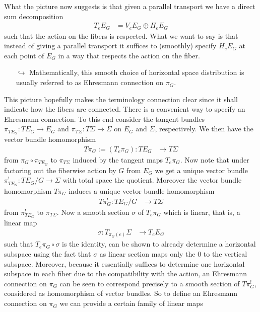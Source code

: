 \begin{enumerate}
\begin{enumerate}
\end{enumerate}
What the picture now suggests is that given a parallel transport we have a direct sum decomposition
\begin{align*}
  T_{e}E_{G}
  &=
  V_{e}E_{G}
  \oplus
  H_{e}E_{G}
\end{align*}
such that the action on the fibers is respected. What we want to say is that instead of giving a parallel transport it suffices to (smoothly) specify $H_{e}E_{G}$ at each point of $E_{G}$ in a way that respects the action on the fiber.
\begin{enumerate}
\item[$\pmb{\hookrightarrow}$]
Mathematically, this smooth choice of horizontal space distribution is usually referred to as Ehresmann connection on $\pi_{G}$.
\end{enumerate}
This picture hopefully makes the terminology {\glqq}connection{\grqq} clear since it shall indicate how the fibers are {\glqq}connected{\grqq}. There is a convenient way to specify an Ehresmann connection. To this end consider the tangent bundles $\pi_{TE_{G}} \colon TE_{G} \rightarrow E_{G}$ and $\pi_{T\Sigma} \colon T\Sigma \rightarrow \Sigma$ on $E_{G}$ and $\Sigma$, respectively. We then have the vector bundle homomorphism
\begin{align*}
  T\pi_{G}
  :=
  (T_{e}\pi_{G})
  \colon
  TE_{G}
  &\rightarrow
  T\Sigma
\end{align*}
from $\pi_{G} \circ \pi_{TE_{G}}$ to $\pi_{T\Sigma}$ induced by the tangent maps $T_{e}\pi_{G}$. Now note that under factoring out the fiberwise action by $G$ from $E_{G}$ we get a unique vector bundle $\pi_{TE_{G}}^{!} \colon TE_{G} \slash G \rightarrow \Sigma$ with total space the quotient. Moreover the vector bundle homomorphism $T\pi_{G}$ induces a unique vector bundle homomorphism
\begin{align*}
  T\pi_{G}^{!}
  \colon
  TE_{G}
  \slash
  G
  &\rightarrow
  T\Sigma
\end{align*}
from $\pi_{TE_{G}}^{!}$ to $\pi_{T\Sigma}$. Now a smooth section $\sigma$ of $T_{e}\pi_{G}$ which is linear, that is, a linear map
\begin{align*}
  \sigma
  \colon
  T_{\pi_{G}(e)}\Sigma
  &\rightarrow
  T_{e}E_{G}
\end{align*}
such that $T_{e}\pi_{G} \circ \sigma$ is the identity, can be shown to already determine a horizontal subspace using the fact that $\sigma$ as linear section maps only the $0$ to the vertical subspace. Moreover, because it essentially suffices to determine one horizontal subspace in each fiber due to the compatibility with the action, an Ehresmann connection on $\pi_{G}$ can be seen to correspond precisely to a smooth section of $T\pi_{G}^{!}$, considered as homomorphism of vector bundles. So to define an Ehresmann connection on $\pi_{G}$ we can provide a certain family of linear maps

\end{enumerate}
